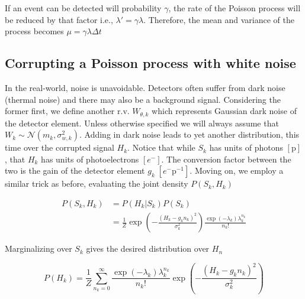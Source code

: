 \documentclass{article}
\begin{document}
If an event can be detected will probability $\gamma$, the rate of the Poisson process will be reduced by that factor i.e., $\lambda' = \gamma\lambda$. Therefore, the mean and variance of the process becomes $\mu = \gamma\lambda\Delta t$


\subsection{Corrupting a Poisson process with white noise}

In the real-world, noise is unavoidable. Detectors often suffer from dark noise (thermal noise) and there may also be a background signal. Considering the former first, we define another r.v. $W_{\theta,k}$ which represents Gaussian dark noise of the detector element. Unless otherwise specified we will always assume that $W_{k} \sim \mathcal{N}(m_{k},\sigma_{w,k}^{2})$. Adding in dark noise leads to yet another distribution, this time over the corrupted signal $H_{k}$. Notice that while $S_{k}$ has units of photons $[\mathrm{p}]$, that $H_{k}$ has units of photoelectrons $[e^{-}]$. The conversion factor between the two is the gain of the detector element $g_{k}\; [e^{-}\mathrm{p}^{-1}]$. Moving on, we employ a similar trick as before, evaluating the joint density $P(S_{k},H_{k})$

\vspace{0.1in}
\begin{align*}
P(S_{k},H_{k}) &= P(H_{k}|S_{k})P(S_{k})\\
&= \frac{1}{Z}\exp\left(-\frac{(H_{k}-g_{k}n_{k})^{2}}{\sigma_{k}^{2}}\right)\frac{\exp\left({-\lambda_{k}}\right)\lambda_{k}^{n_{k}}}{n_{k}!}
\end{align*}
\vspace{0.1in}

Marginalizing over $S_{k}$ gives the desired distribution over $H_{n}$

\begin{equation*}
P(H_{k}) = \frac{1}{Z}\sum_{n_{k}=0}^{\infty}\frac{\exp\left({-\lambda_{k}}\right)\lambda_{k}^{n_{k}}}{n_{k}!}\exp\left(-\frac{(H_{k}-g_{k}n_{k})^{2}}{\sigma_{k}^{2}}\right)
\end{equation*}
\end{document}
